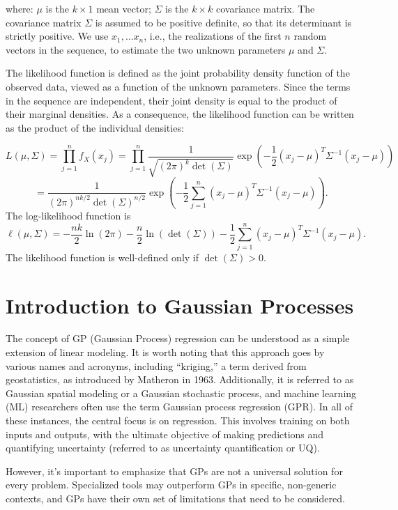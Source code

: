 \documentclass[
  letterpaper,
  DIV=11,
  numbers=noendperiod]{scrreprt}
\begin{document}
where: \(\mu\) is the \(k \times 1\) mean vector; \(\Sigma\) is the
\(k \times k\) covariance matrix. The covariance matrix \(\Sigma\) is
assumed to be positive definite, so that its determinant is strictly
positive. We use \(x_1, \ldots x_n\), i.e., the realizations of the
first \(n\) random vectors in the sequence, to estimate the two unknown
parameters \(\mu\) and \(\Sigma\).

The likelihood function is defined as the joint probability density
function of the observed data, viewed as a function of the unknown
parameters. Since the terms in the sequence are independent, their joint
density is equal to the product of their marginal densities. As a
consequence, the likelihood function can be written as the product of
the individual densities:

\[
L(\mu, \Sigma) = \prod_{j=1}^n f_X(x_j) = \prod_{j=1}^n \frac{1}{\sqrt{(2\pi)^k \det(\Sigma)}} \exp\left(-\frac{1}{2} (x_j-\mu)^T\Sigma^{-1} (x_j-\mu)\right)
\] \[
= \frac{1}{(2\pi)^{nk/2} \det(\Sigma)^{n/2}} \exp\left(-\frac{1}{2} \sum_{j=1}^n (x_j-\mu)^T\Sigma^{-1} (x_j-\mu)\right).
\] The log-likelihood function is \[
\ell(\mu, \Sigma) = -\frac{nk}{2} \ln(2\pi) - \frac{n}{2} \ln(\det(\Sigma)) - \frac{1}{2} \sum_{j=1}^n (x_j-\mu)^T\Sigma^{-1} (x_j-\mu).
\] The likelihood function is well-defined only if \(\det(\Sigma)>0\).

\section{Introduction to Gaussian
Processes}\label{introduction-to-gaussian-processes}

The concept of GP (Gaussian Process) regression can be understood as a
simple extension of linear modeling. It is worth noting that this
approach goes by various names and acronyms, including ``kriging,'' a
term derived from geostatistics, as introduced by Matheron in 1963.
Additionally, it is referred to as Gaussian spatial modeling or a
Gaussian stochastic process, and machine learning (ML) researchers often
use the term Gaussian process regression (GPR). In all of these
instances, the central focus is on regression. This involves training on
both inputs and outputs, with the ultimate objective of making
predictions and quantifying uncertainty (referred to as uncertainty
quantification or UQ).

However, it's important to emphasize that GPs are not a universal
solution for every problem. Specialized tools may outperform GPs in
specific, non-generic contexts, and GPs have their own set of
limitations that need to be considered.
\end{document}
